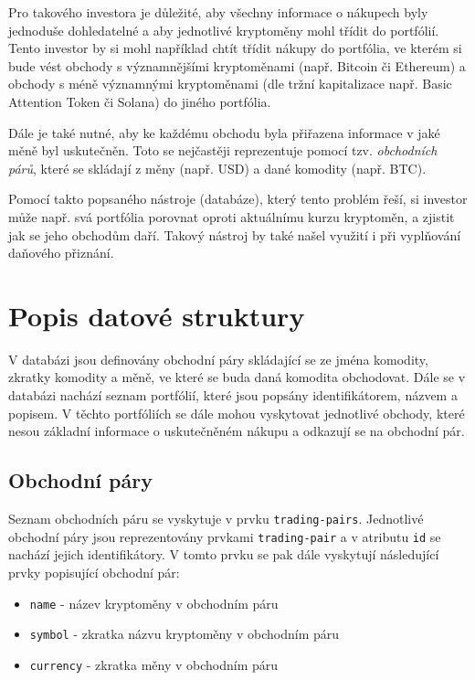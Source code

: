 \documentclass[12pt, a4paper]{article}
\let\oldsection\section
\renewcommand\section{\clearpage\oldsection}
\begin{document}
Pro takového investora je důležité, aby všechny informace o nákupech byly jednoduše dohledatelné a aby jednotlivé kryptoměny mohl třídit do portfólií. Tento investor by si mohl například chtít třídit nákupy do portfólia, ve kterém si bude vést obchody s významnějšími kryptoměnami (např. Bitcoin či Ethereum) a obchody s méně významnými kryptoměnami (dle tržní kapitalizace např. Basic Attention Token či Solana) do jiného portfólia.
    
Dále je také nutné, aby ke každému obchodu byla přiřazena informace v jaké měně byl uskutečněn. Toto se nejčastěji reprezentuje pomocí tzv. \textit{obchodních párů}, které se skládají z měny (např. USD) a dané komodity (např. BTC).

Pomocí takto popsaného nástroje (databáze), který tento problém řeší, si investor může např. svá portfólia porovnat oproti aktuálnímu kurzu kryptoměn, a zjistit jak se jeho obchodům daří. Takový nástroj by také našel využití i při vyplňování daňového přiznání.

\section{Popis datové struktury}

V databázi jsou definovány obchodní páry skládající se ze jména komodity, zkratky komodity a měně, ve které se buda daná komodita obchodovat. Dále se v databázi nachází seznam portfólií, které jsou popsány identifikátorem, názvem a popisem. V těchto portfóliích se dále mohou vyskytovat jednotlivé obchody, které nesou základní informace o uskutečněném nákupu a odkazují se na obchodní pár.

\subsection{Obchodní páry}
Seznam obchodních páru se vyskytuje v prvku \texttt{trading-pairs}. Jednotlivé obchodní páry jsou reprezentovány prvkami \texttt{trading-pair} a v atributu \texttt{id} se nachází jejich identifikátory. V tomto prvku se pak dále vyskytují následující prvky popisující obchodní pár:

\begin{itemize}
    \item \texttt{name} - název kryptoměny v obchodním páru
    \item \texttt{symbol} - zkratka názvu kryptoměny v obchodním páru 
    \item \texttt{currency} - zkratka měny v obchodním páru 
\end{itemize}
\end{document}
